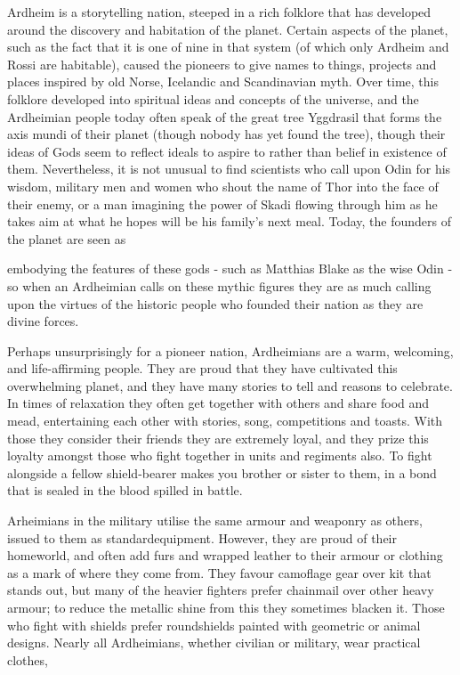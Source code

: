 Ardheim is a storytelling nation, steeped in a rich folklore that has developed around the discovery and habitation of the planet. Certain aspects of the planet, such as the fact that it is one of nine in that system (of which only Ardheim and Rossi are habitable), caused the pioneers to give names to things, projects and places inspired by old Norse, Icelandic and Scandinavian myth. Over time, this folklore developed into spiritual ideas and concepts of the universe, and the Ardheimian people today often speak of the great tree Yggdrasil that forms the axis mundi of their planet (though nobody has yet found the tree), though their ideas of Gods seem to reflect ideals to aspire to rather than belief in existence of them. Nevertheless, it is not unusual to find scientists who call upon Odin for his wisdom, military men and women who shout the name of Thor into the face of their enemy, or a man imagining the power of Skadi flowing through him as he takes aim at what he hopes will be his family's next meal. Today, the founders of the planet are seen as

embodying the features of these gods - such as Matthias Blake as the wise Odin - so when an Ardheimian calls on these mythic figures they are as much calling upon the virtues of the historic people who founded their nation as they are divine forces.

Perhaps unsurprisingly for a pioneer nation, Ardheimians are a warm, welcoming, and life-affirming people. They are proud that they have cultivated this overwhelming planet, and they have many stories to tell and reasons to celebrate. In times of relaxation they often get together with others and share food and mead, entertaining each other with stories, song, competitions and toasts. With those they consider their friends they are extremely loyal, and they prize this loyalty amongst those who fight together in units and regiments also. To fight alongside a fellow shield-bearer makes you brother or sister to them, in a bond that is sealed in the blood spilled in battle.

Arheimians in the military utilise the same armour and weaponry as others, issued to them as standardequipment. However, they are proud of their homeworld, and often add furs and wrapped leather to their armour or clothing as a mark of where they come from. They favour camoflage gear over kit that stands out, but many of the heavier fighters prefer chainmail over other heavy armour; to reduce the metallic shine from this they sometimes blacken it. Those who fight with shields prefer roundshields painted with geometric or animal designs. Nearly all Ardheimians, whether civilian or military, wear practical clothes,

